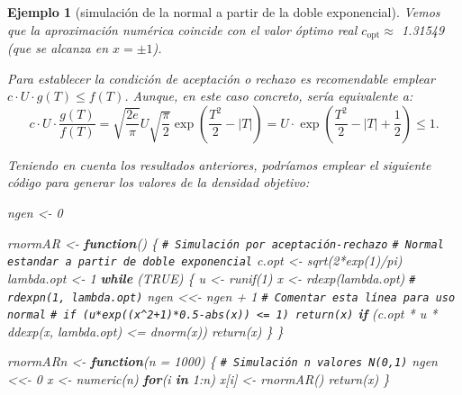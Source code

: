 \documentclass[
  10pt,
]{book}
\newenvironment{Shaded}{\begin{snugshade}}{\end{snugshade}}
\newcommand{\AttributeTok}[1]{\textcolor[rgb]{0.77,0.63,0.00}{#1}}
\newcommand{\CommentTok}[1]{\textcolor[rgb]{0.56,0.35,0.01}{\textit{#1}}}
\newcommand{\ConstantTok}[1]{\textcolor[rgb]{0.00,0.00,0.00}{#1}}
\newcommand{\ControlFlowTok}[1]{\textcolor[rgb]{0.13,0.29,0.53}{\textbf{#1}}}
\newcommand{\DecValTok}[1]{\textcolor[rgb]{0.00,0.00,0.81}{#1}}
\newcommand{\FunctionTok}[1]{\textcolor[rgb]{0.00,0.00,0.00}{#1}}
\newcommand{\NormalTok}[1]{#1}
\newcommand{\OtherTok}[1]{\textcolor[rgb]{0.56,0.35,0.01}{#1}}
\newcommand{\SpecialCharTok}[1]{\textcolor[rgb]{0.00,0.00,0.00}{#1}}
\theoremstyle{break}
\newtheorem{example}{Ejemplo}[chapter]
\theoremstyle{nonumberplain}
\renewcommand{\CommentTok}[1]{\textcolor[rgb]{0.41,0.41,0.41}{\texttt{#1}}}
\begin{document}
\begin{example}[simulación de la normal a partir de la doble exponencial]
Vemos que la aproximación numérica coincide con el valor óptimo real \(c_{\text{opt}} \approx\) 1.31549 (que se alcanza en \(x = \pm 1\)).

Para establecer la condición de aceptación o rechazo es recomendable emplear
\(c\cdot U\cdot g(T) \leq f(T)\).
Aunque, en este caso concreto, sería equivalente a:
\[c\cdot U\cdot\frac{g(T)  }{f(T)  }=\sqrt{\frac
{2e}{\pi}}U\sqrt{\frac{\pi}{2}}\exp\left( \frac{T^{2}}{2}-\left\vert
T\right\vert \right)  =U\cdot\exp\left( \frac{T^{2}}{2}-\left\vert
T\right\vert +\frac{1}{2}\right) \leq 1.\]

Teniendo en cuenta los resultados anteriores, podríamos emplear el siguiente código para generar los valores de la densidad objetivo:

\begin{Shaded}
\begin{Highlighting}[]
\NormalTok{ngen }\OtherTok{\textless{}{-}} \DecValTok{0}

\NormalTok{rnormAR }\OtherTok{\textless{}{-}} \ControlFlowTok{function}\NormalTok{() \{}
\CommentTok{\# Simulación por aceptación{-}rechazo}
\CommentTok{\# Normal estandar a partir de doble exponencial}
\NormalTok{  c.opt }\OtherTok{\textless{}{-}} \FunctionTok{sqrt}\NormalTok{(}\DecValTok{2}\SpecialCharTok{*}\FunctionTok{exp}\NormalTok{(}\DecValTok{1}\NormalTok{)}\SpecialCharTok{/}\NormalTok{pi)}
\NormalTok{  lambda.opt }\OtherTok{\textless{}{-}} \DecValTok{1}
  \ControlFlowTok{while}\NormalTok{ (}\ConstantTok{TRUE}\NormalTok{) \{}
\NormalTok{    u }\OtherTok{\textless{}{-}} \FunctionTok{runif}\NormalTok{(}\DecValTok{1}\NormalTok{)}
\NormalTok{    x }\OtherTok{\textless{}{-}} \FunctionTok{rdexp}\NormalTok{(lambda.opt) }\CommentTok{\# rdexpn(1, lambda.opt)}
\NormalTok{    ngen }\OtherTok{\textless{}\textless{}{-}}\NormalTok{ ngen }\SpecialCharTok{+} \DecValTok{1} \CommentTok{\# Comentar esta línea para uso normal}
    \CommentTok{\# if (u*exp((x\^{}2+1)*0.5{-}abs(x)) \textless{}= 1) return(x)}
    \ControlFlowTok{if}\NormalTok{ (c.opt }\SpecialCharTok{*}\NormalTok{ u }\SpecialCharTok{*} \FunctionTok{ddexp}\NormalTok{(x, lambda.opt) }\SpecialCharTok{\textless{}=} \FunctionTok{dnorm}\NormalTok{(x)) }\FunctionTok{return}\NormalTok{(x)}
\NormalTok{  \}}
\NormalTok{\}}

\NormalTok{rnormARn }\OtherTok{\textless{}{-}} \ControlFlowTok{function}\NormalTok{(}\AttributeTok{n =} \DecValTok{1000}\NormalTok{) \{}
\CommentTok{\# Simulación n valores N(0,1)}
\NormalTok{  ngen }\OtherTok{\textless{}\textless{}{-}} \DecValTok{0}
\NormalTok{  x }\OtherTok{\textless{}{-}} \FunctionTok{numeric}\NormalTok{(n)}
  \ControlFlowTok{for}\NormalTok{(i }\ControlFlowTok{in} \DecValTok{1}\SpecialCharTok{:}\NormalTok{n) x[i] }\OtherTok{\textless{}{-}} \FunctionTok{rnormAR}\NormalTok{()}
  \FunctionTok{return}\NormalTok{(x)}
\NormalTok{\}}
\end{Highlighting}
\end{Shaded}


\end{example}
\end{document}
